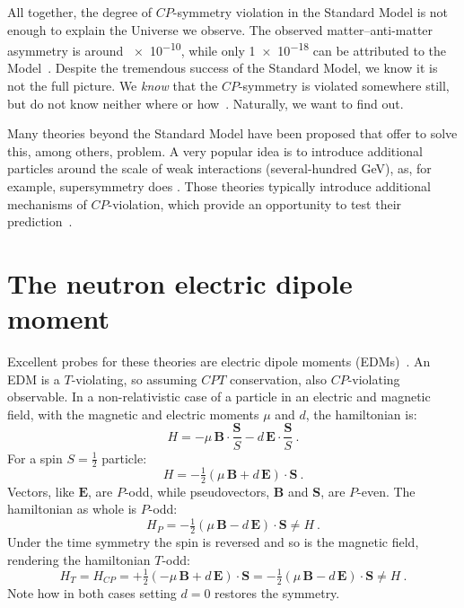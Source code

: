 All together, the degree of $CP$-symmetry violation in the Standard Model is not enough to explain the Universe we observe. The observed matter--anti-matter asymmetry is around \num{e-10}, while only \num{1e-18} can be attributed to the Model~\cite{Riotto1999}. Despite the tremendous success of the Standard Model, we know it is not the full picture. We \emph{know} that the $CP$-symmetry is violated somewhere still, but do not know neither where or how~\cite{Pospelov2005}. Naturally, we want to find out. 

Many theories beyond the Standard Model have been proposed that offer to solve this, among others, problem. A very popular idea is to introduce additional particles around the scale of weak interactions (several-hundred GeV), as, for example, supersymmetry does . Those theories typically introduce additional mechanisms of $CP$-violation, which provide an opportunity to test their prediction~\cite{Ellis1989}.



\section{The neutron electric dipole moment}

Excellent probes for these theories are electric dipole moments (EDMs)~\cite{Pospelov2005}. An EDM is a $T$-violating, so assuming $CPT$ conservation, also $CP$-violating observable. In a non-relativistic case of a particle in an electric and magnetic field, with the magnetic and electric moments $\mu$ and $d$, the hamiltonian is:
\begin{equation}
  H = - \mu \, \bm{B} \cdot \frac{\bm{S}}{S} - d \, \bm{E} \cdot \frac{\bm{S}}{S} \ .
\end{equation}
For a spin $S = \frac{1}{2}$ particle:
\begin{equation}
  H = - \tfrac{1}{2} \left( \mu \, \bm{B} + d \, \bm{E} \right ) \cdot \bm{S} \ .
\end{equation}
Vectors, like $\bm{E}$, are $P$-odd, while pseudovectors, $\bm{B}$ and $\bm{S}$, are $P$-even. The hamiltonian as whole is $P$-odd:
\begin{equation}
  H_P = - \tfrac{1}{2} \left( \mu \, \bm{B} - d \, \bm{E} \right ) \cdot \bm{S} \neq H \ .
\end{equation}
Under the time symmetry the spin is reversed and so is the magnetic field, rendering the hamiltonian $T$-odd:
\begin{equation}
  H_T = H_{CP} = + \tfrac{1}{2} \left( - \mu \, \bm{B} + d \, \bm{E} \right ) \cdot \bm{S} = - \tfrac{1}{2} \left( \mu \, \bm{B} - d \, \bm{E} \right ) \cdot \bm{S} \neq H \ .
\end{equation}
Note how in both cases setting $d = 0$ restores the symmetry.

